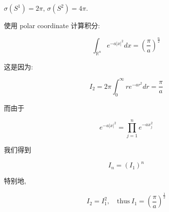 \documentclass{qlnotes-export}
\begin{document}
\begin{example}

\(\sigma(S^{1}) = 2\pi\), \(\sigma(S^{2}) = 4\pi\).

\end{example}

\begin{example}

使用 polar coordinate 计算积分:

\[\int_{{\mathbb{R}}^{n}}e^{- a|x|^{2}} dx = (\frac{\pi}{a})^{\frac{n}{2}}\]

这是因为:

\[I_{2} = 2\pi\int_{0}^{\infty}re^{- ar^{2}} dr = \frac{\pi}{a}\]

而由于

\[e^{- a|x|^{2}} = \prod\limits_{j = 1}^{n}e^{- ax_{j}^{2}}\]

我们得到

\[I_{n} = (I_{1})^{n}\]

特别地,

\[I_{2} = I_{1}^{2},\quad\text{thus}\ I_{1} = (\frac{\pi}{a})^{\frac{1}{2}}\]

\end{example}
\end{document}
